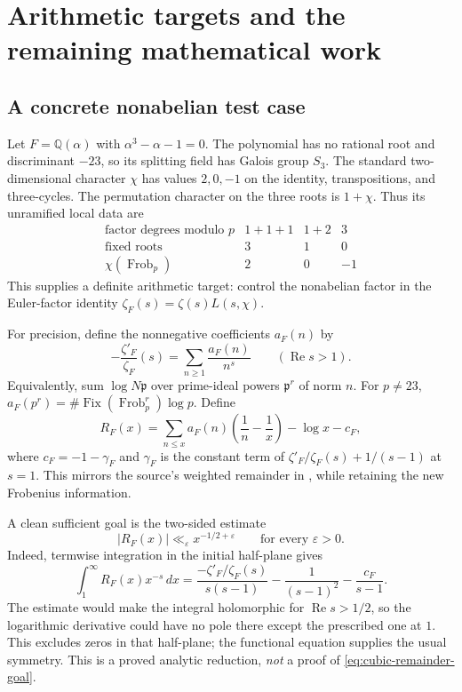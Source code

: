 \section{Arithmetic targets and the remaining mathematical work}
\label{sec:arithmetic-targets}

\subsection{A concrete nonabelian test case}

Let $F=\mathbb Q(\alpha)$ with $\alpha^3-\alpha-1=0$.
The polynomial has no rational root and discriminant $-23$, so its
splitting field has Galois group $S_3$. The standard two-dimensional
character $\chi$ has values $2,0,-1$ on the identity, transpositions,
and three-cycles. The permutation character on the three roots is
$1+\chi$. Thus its unramified local data are
\[
\begin{array}{c|ccc}
\text{factor degrees modulo }p & 1+1+1&1+2&3\\ \hline
\text{fixed roots} &3&1&0\\
\chi(\operatorname{Frob}_p)&2&0&-1
\end{array}
\]
This supplies a definite arithmetic target: control the nonabelian
factor in the Euler-factor identity
$\zeta_F(s)=\zeta(s)L(s,\chi)$.

For precision, define the nonnegative coefficients $a_F(n)$ by
\[
 -\frac{\zeta'_F}{\zeta_F}(s)=\sum_{n\ge1}\frac{a_F(n)}{n^s}
       \qquad(\operatorname{Re}s>1).
\]
Equivalently, sum $\log N\mathfrak p$ over prime-ideal powers
$\mathfrak p^r$ of norm $n$. For $p\ne23$,
$a_F(p^r)=\#\operatorname{Fix}(\operatorname{Frob}_p^r)\log p$.
Define
\[
 R_F(x)=\sum_{n\le x}a_F(n)\left(\frac1n-\frac1x\right)
                    -\log x-c_F,
\]
where $c_F=-1-\gamma_F$ and $\gamma_F$ is the constant term of
$\zeta'_F/\zeta_F(s)+1/(s-1)$ at $s=1$.
This mirrors the source's weighted remainder in
, while retaining
the new Frobenius information.

A clean sufficient goal is the two-sided estimate
\begin{equation}
 \label{eq:cubic-remainder-goal}
 |R_F(x)|\ll_\varepsilon x^{-1/2+\varepsilon}
                  \qquad\text{for every }\varepsilon>0.
\end{equation}
Indeed, termwise integration in the initial half-plane gives
\[
 \int_1^\infty R_F(x)x^{-s}\,dx
 =\frac{-\zeta'_F/\zeta_F(s)}{s(s-1)}
       -\frac1{(s-1)^2}-\frac{c_F}{s-1}.
\]
The estimate would make the integral holomorphic for
$\operatorname{Re}s>1/2$, so the logarithmic derivative could have no
pole there except the prescribed one at $1$. This excludes zeros in
that half-plane; the functional equation supplies the usual symmetry.
This is a proved analytic reduction, \emph{not} a proof of
\eqref{eq:cubic-remainder-goal}.


